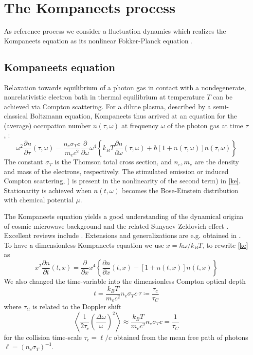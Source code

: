 \documentclass[a4paper,12pt,reqno,superscriptaddress,nofootinbib]{article}
\theoremstyle{plain}
\theoremstyle{definition}
\theoremstyle{remark}
\newcommand{\0}{^{(0)}}
\newcommand{\1}{^{(1)}}
\newcommand{\2}{^{(2)}}
\begin{document}
\section{The Kompaneets process}

As reference process we consider a fluctuation dynamics which realizes the Kompaneets equation as its nonlinear Fokker-Planck equation \cite{paper2}.

\subsection{Kompaneets equation}
Relaxation towards equilibrium of a photon gas in contact with a nondegenerate, nonrelativistic electron bath in thermal equilibrium at temperature $T$ can be achieved via  Compton scattering.  For a dilute plasma, described by a semi-classical Boltzmann equation, Kompaneets thus arrived at an equation for the (average) occupation number $n(\tau,\omega)$ at frequency $\omega$ of the photon gas at time $\tau$, \cite{kompa}:
\begin{equation}\label{ke}
\omega^2\frac{\partial n}{\partial \tau}(\tau,\omega)= \frac{n_e\sigma_T 
	c}{m_e c^2}\frac{\partial }{\partial \omega}\omega^4\left\{k_B T 
\frac{\partial n}{\partial \omega}(\tau,\omega) + 
\hbar\left[1+n(\tau,\omega)\right]n(\tau,\omega)\right\}
\end{equation}
The constant $\sigma_T$ is the Thomson total cross section, and $n_e,m_e$ are  the density and mass of the electrons, respectively.
The stimulated emission or induced Compton scattering, \cite{liedahl, blandford}) is present in the  nonlinearity of the second term) in \eqref{ke}. Stationarity is achieved when $n(t,\omega)$ becomes the Bose-Einstein distribution with chemical potential $\mu$.

The Kompaneets equation yields a good understanding of the dynamical origina of cosmic microwave background and the related Sunyaev-Zeldovich effect \cite{sunyaeveffect,sunyaev}.  Excellent reviews include \cite{practical,gui,zeldovich}. Extensions and generalizations are e.g. obtained in \cite{buet, pitrou,barbosa, brown, itoh, itoh2, cooper, kohyama1, kohyama2, kohyama3,paper}.\\

To have a dimensionless Kompaneets equation we use $x= \hbar \omega/k_B T$, to rewrite \eqref{ke} as
\begin{equation}\label{ake}
x^2\frac{\partial n}{\partial t}(t,x) = \frac{\partial }{\partial x}x^4\left\{
\frac{\partial n}{\partial x}(t,x) + 
\left[1+n(t,x)\right]n(t,x)\right\}
\end{equation}
We also changed the time-variable into the dimensionless Compton optical depth
\[t = \frac{ k_B T }{m_e c^2} n_e \sigma_T c \, \tau\coloneqq \frac{ \tau_c}{\tau_C}\]
where $\tau_C$  is related to the Doppler shift
\begin{equation}\label{shift}
\left\langle\frac{1}{2\tau_c}\left(\frac{\Delta\omega}{\omega}\right)^2\right\rangle\approx \frac{ k_B T }{m_e c^2} n_e \sigma_T c= \frac{1}{\tau_C}
\end{equation} 
for the collision time-scale $\tau_c = \ell/c$ obtained from the mean free path of photons $\ell=(n_e\sigma_T)^{-1}$.\\
\end{document}
